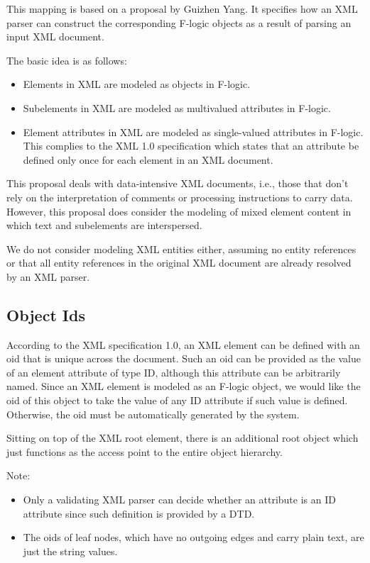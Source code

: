 This mapping is based on a proposal by Guizhen Yang.
It specifies how an XML parser can construct the
corresponding F-logic objects as a result of parsing an input XML
document.

The basic idea is as follows:
\begin{itemize}
\item Elements in XML are modeled as objects in F-logic.

\item Subelements in XML are modeled as multivalued attributes in F-logic.

\item Element attributes in XML are modeled as single-valued attributes
    in F-logic. This complies to the XML 1.0 specification which states
    that an attribute be defined only once for each element in an XML
    document.
\end{itemize}

This proposal deals with data-intensive XML documents, i.e., those that
don't rely on the interpretation of comments or processing instructions to
carry data. However, this proposal does consider the modeling of mixed
element content in which text and subelements are interspersed.

We do not consider modeling XML entities either, assuming no entity
references or that all entity references in the original XML document
are already resolved by an XML parser.



\subsection{Object Ids}

According to the XML specification 1.0, an XML element can be defined
with an oid that is unique across the document. Such an oid can be
provided as the value of an element attribute of type ID, although
this attribute can be arbitrarily named. Since an XML element is
modeled as an F-logic object, we would like the oid of this object to
take the value of any ID attribute if such value is defined.
Otherwise, the oid must be automatically generated by the system.

Sitting on top of the XML root element, there is an additional root
object which just functions as the access point to the entire object
hierarchy.

Note:
\begin{itemize}
\item Only a validating XML parser can decide whether an attribute
    is an ID attribute since such definition is provided by a DTD.

\item The oids of leaf nodes, which have no outgoing edges and carry
    plain text, are just the string values.
\end{itemize}

